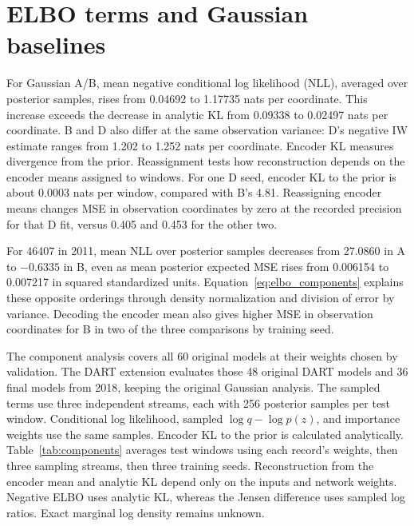 \documentclass{article}
\begin{document}
\section{ELBO terms and Gaussian baselines}
For Gaussian A/B, mean negative conditional log likelihood (NLL), averaged over posterior samples, rises from 0.04692 to 1.17735 nats per coordinate. This increase exceeds the decrease in analytic KL from 0.09338 to 0.02497 nats per coordinate. B and D also differ at the same observation variance: D's negative IW estimate ranges from 1.202 to 1.252 nats per coordinate. Encoder KL measures divergence from the prior. Reassignment tests how reconstruction depends on the encoder means assigned to windows. For one D seed, encoder KL to the prior is about $0.0003$ nats per window, compared with B's 4.81. Reassigning encoder means changes MSE in observation coordinates by zero at the recorded precision for that D fit, versus 0.405 and 0.453 for the other two.

For 46407 in 2011, mean NLL over posterior samples decreases from 27.0860 in A to $-0.6335$ in B, even as mean posterior expected MSE rises from 0.006154 to 0.007217 in squared standardized units. Equation~\ref{eq:elbo_components} explains these opposite orderings through density normalization and division of error by variance. Decoding the encoder mean also gives higher MSE in observation coordinates for B in two of the three comparisons by training seed.

The component analysis covers all 60 original models at their weights chosen by validation. The DART extension evaluates those 48 original DART models and 36 final models from 2018, keeping the original Gaussian analysis. The sampled terms use three independent streams, each with 256 posterior samples per test window. Conditional log likelihood, sampled $\log q-\log p(z)$, and importance weights use the same samples. Encoder KL to the prior is calculated analytically. Table~\ref{tab:components} averages test windows using each record's weights, then three sampling streams, then three training seeds. Reconstruction from the encoder mean and analytic KL depend only on the inputs and network weights. Negative ELBO uses analytic KL, whereas the Jensen difference uses sampled log ratios. Exact marginal log density remains unknown.
\end{document}

